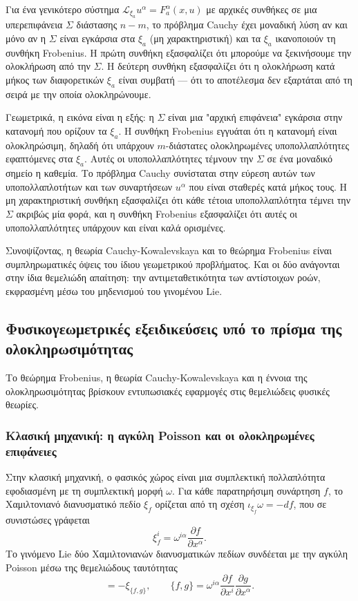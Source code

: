 \documentclass[12pt]{article}
\begin{document}
Για ένα γενικότερο σύστημα $\mathcal{L}_{\xi_a} u^\alpha = F_a^\alpha(x, u)$ με αρχικές συνθήκες σε μια υπερεπιφάνεια $\Sigma$ διάστασης $n-m$, το πρόβλημα Cauchy έχει μοναδική λύση αν και μόνο αν η $\Sigma$ είναι εγκάρσια στα $\xi_a$ (μη χαρακτηριστική) και τα $\xi_a$ ικανοποιούν τη συνθήκη Frobenius. Η πρώτη συνθήκη εξασφαλίζει ότι μπορούμε να ξεκινήσουμε την ολοκλήρωση από την $\Sigma$. Η δεύτερη συνθήκη εξασφαλίζει ότι η ολοκλήρωση κατά μήκος των διαφορετικών $\xi_a$ είναι συμβατή — ότι το αποτέλεσμα δεν εξαρτάται από τη σειρά με την οποία ολοκληρώνουμε.

Γεωμετρικά, η εικόνα είναι η εξής: η $\Sigma$ είναι μια "αρχική επιφάνεια" εγκάρσια στην κατανομή που ορίζουν τα $\xi_a$. Η συνθήκη Frobenius εγγυάται ότι η κατανομή είναι ολοκληρώσιμη, δηλαδή ότι υπάρχουν $m$-διάστατες ολοκληρωμένες υποπολλαπλότητες εφαπτόμενες στα $\xi_a$. Αυτές οι υποπολλαπλότητες τέμνουν την $\Sigma$ σε ένα μοναδικό σημείο η καθεμία. Το πρόβλημα Cauchy συνίσταται στην εύρεση αυτών των υποπολλαπλοτήτων και των συναρτήσεων $u^\alpha$ που είναι σταθερές κατά μήκος τους. Η μη χαρακτηριστική συνθήκη εξασφαλίζει ότι κάθε τέτοια υποπολλαπλότητα τέμνει την $\Sigma$ ακριβώς μία φορά, και η συνθήκη Frobenius εξασφαλίζει ότι αυτές οι υποπολλαπλότητες υπάρχουν και είναι καλά ορισμένες.

Συνοψίζοντας, η θεωρία Cauchy-Kowalevskaya και το θεώρημα Frobenius είναι συμπληρωματικές όψεις του ίδιου γεωμετρικού προβλήματος. Και οι δύο ανάγονται στην ίδια θεμελιώδη απαίτηση: την αντιμεταθετικότητα των αντίστοιχων ροών, εκφρασμένη μέσω του μηδενισμού του γινομένου Lie.

\subsection{Φυσικογεωμετρικές εξειδικεύσεις υπό το πρίσμα της ολοκληρωσιμότητας}

Το θεώρημα Frobenius, η θεωρία Cauchy-Kowalevskaya και η έννοια της ολοκληρωσιμότητας βρίσκουν εντυπωσιακές εφαρμογές στις θεμελιώδεις φυσικές θεωρίες.

\subsubsection{Κλασική μηχανική: η αγκύλη Poisson και οι ολοκληρωμένες επιφάνειες}

Στην κλασική μηχανική, ο φασικός χώρος είναι μια συμπλεκτική πολλαπλότητα εφοδιασμένη με τη συμπλεκτική μορφή $\omega$. Για κάθε παρατηρήσιμη συνάρτηση $f$, το Χαμιλτονιανό διανυσματικό πεδίο $\xi_f$ ορίζεται από τη σχέση $\iota_{\xi_f} \omega = -df$, που σε συνιστώσες γράφεται
\begin{equation}
\xi_f^i = \omega^{i\alpha} \frac{\partial f}{\partial x^\alpha}.
\end{equation}
Το γινόμενο Lie δύο Χαμιλτονιανών διανυσματικών πεδίων συνδέεται με την αγκύλη Poisson μέσω της θεμελιώδους ταυτότητας
\begin{equation}
[\xi_f, \xi_g] = -\xi_{\{f, g\}}, \qquad \{f, g\} = \omega^{i\alpha} \frac{\partial f}{\partial x^i} \frac{\partial g}{\partial x^\alpha}.
\end{equation}
\end{document}
